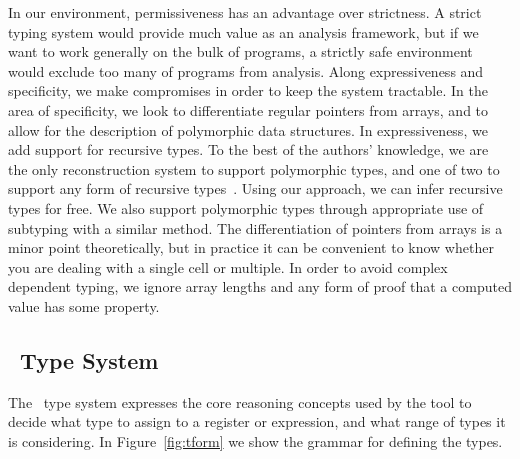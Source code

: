 In our environment, permissiveness has an advantage over strictness. A strict typing system would provide much value as an analysis framework, but if we want to work generally on the bulk of programs, a strictly safe environment would exclude too many of programs from analysis. Along expressiveness and specificity, we make compromises in order to keep the system tractable. In the area of specificity, we look to differentiate regular pointers from arrays, and to allow for the description of polymorphic data structures. In expressiveness, we add support for recursive types. To the best of the authors' knowledge, we are the only reconstruction system to support polymorphic types, and one of two to support any form of recursive types~\cite{sw}. Using our approach, we can infer recursive types for free. We also support polymorphic types through appropriate use of subtyping with a similar method. The differentiation of pointers from arrays is a minor point theoretically, but in practice it can be convenient to know whether you are dealing with a single cell or multiple. In order to avoid complex dependent typing, we ignore array lengths and any form of proof that a computed value has some property.

\subsection{\bitr\ Type System}
\label{subsec:typesys}
The \bitr\ type system expresses the core reasoning concepts used by the tool to decide what type to assign to a register or expression, and what range of types it is considering. In Figure~\ref{fig:tform} we show the grammar for defining the types.

